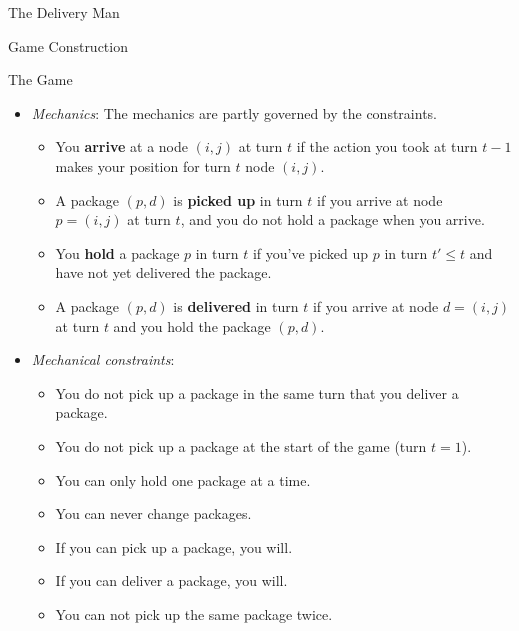 \begin{section}{The Delivery Man}
\begin{subsection}{Game Construction}
\begin{subsubsection}{The Game}
\begin{itemize}
          If an action is \textbf{valid}, you start turn $t+1$ on the indicated to-node. An action is \textbf{invalid} if the indicated to-node does not exists, in which case the action is taken to be $a_5$ and you remain at the same node at turn $t+1$.\\
          \textbf{Turns} are enumerated by increasing integers starting with $t = 1$. 

        \item \textit{Mechanics}:
          The mechanics are partly governed by the constraints.
          \begin{itemize}
          \item You \textbf{arrive} at a node $(i, j)$ at turn $t$ if the action you took at turn $t-1$ makes your position for turn $t$ node $(i, j)$.
            
          \item A package $(p, d)$ is \textbf{picked up} in turn $t$ if you arrive at node $p = (i, j)$ at turn $t$, and you do not hold a package when you arrive.

          \item You \textbf{hold} a package $p$ in turn $t$ if you've picked up $p$ in turn $t' \leq t$ and have not yet delivered the package. 

          \item A package $(p, d)$ is \textbf{delivered} in turn $t$ if you arrive at node $d = (i, j)$ at turn $t$ and you hold the package $(p, d)$.  

          \end{itemize}
          
        \item \textit{Mechanical constraints}:
          \begin{itemize}
          \item You do not pick up a package in the same turn that you deliver a package.
          \item You do not pick up a package at the start of the game (turn $t = 1$).
          \item You can only hold one package at a time.
          \item You can never change packages.
          \item If you can pick up a package, you will.
          \item If you can deliver a package, you will.
          \item You can not pick up the same package twice.
          \end{itemize}
      \end{itemize}


\end{subsubsection}
\end{subsection}
\end{section}
